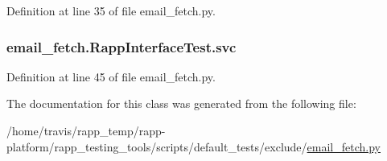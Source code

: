 Definition at line 35 of file email\-\_\-fetch.\-py.

\hypertarget{classemail__fetch_1_1RappInterfaceTest_ac7e19278efc30da520c1390d6a4dda92}{
\subsubsection[{svc}]{\setlength{\rightskip}{0pt plus 5cm}email\-\_\-fetch.\-Rapp\-Interface\-Test.\-svc}}\label{classemail__fetch_1_1RappInterfaceTest_ac7e19278efc30da520c1390d6a4dda92}


Definition at line 45 of file email\-\_\-fetch.\-py.



The documentation for this class was generated from the following file\-:\begin{DoxyCompactItemize}
\item 
/home/travis/rapp\-\_\-temp/rapp-\/platform/rapp\-\_\-testing\-\_\-tools/scripts/default\-\_\-tests/exclude/\hyperlink{email__fetch_8py}{email\-\_\-fetch.\-py}\end{DoxyCompactItemize}
